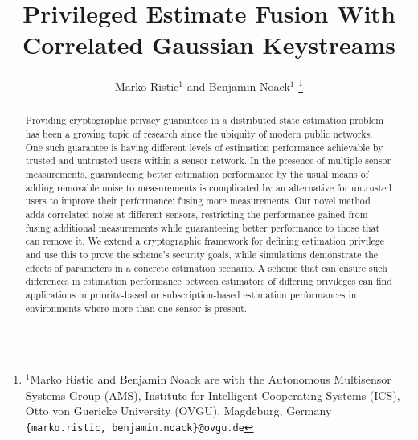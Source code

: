 \documentclass[letterpaper, 10 pt, conference]{ieeeconf}
\title{\LARGE \bf
Privileged Estimate Fusion With Correlated Gaussian Keystreams
}
\author{Marko Ristic$^{1}$ and Benjamin Noack$^{1}$%
\thanks{$^{1}$Marko Ristic and Benjamin Noack are with the Autonomous Multisensor Systems Group (AMS), Institute for Intelligent Cooperating Systems (ICS), Otto von Guericke University (OVGU), Magdeburg, Germany {\tt\small \{marko.ristic, benjamin.noack\}@ovgu.de}}%
}
\begin{document}
\maketitle
\thispagestyle{empty}
\pagestyle{empty}



% 
%                                    
%                                    
%                                    
% 

\begin{abstract}
  Providing cryptographic privacy guarantees in a distributed state estimation problem has been a growing topic of research since the ubiquity of modern public networks. One such guarantee is having different levels of estimation performance achievable by trusted and untrusted users within a sensor network. In the presence of multiple sensor measurements, guaranteeing better estimation performance by the usual means of adding removable noise to measurements is complicated by an alternative for untrusted users to improve their performance: fusing more measurements. Our novel method adds correlated noise at different sensors, restricting the performance gained from fusing additional measurements while guaranteeing better performance to those that can remove it. We extend a cryptographic framework for defining estimation privilege and use this to prove the scheme's security goals, while simulations demonstrate the effects of parameters in a concrete estimation scenario. A scheme that can ensure such differences in estimation performance between estimators of differing privileges can find applications in priority-based or subscription-based estimation performances in environments where more than one sensor is present.
\end{abstract}



% 
%                                                        
%                                                        
%                                                        
% 
\end{document}
